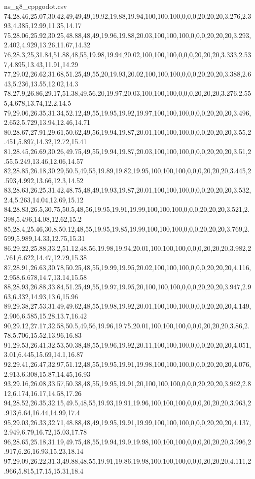 \begin{filecontents*}[overwrite]{ns_g8_cppgodot.csv}
74,28.46,25.07,30.42,49,49,49,19.92,19.88,19.94,100,100,100,0,0,0,20,20,20,3.276,2.393,4.385,12.99,11.35,14.17
75,28.06,25.92,30.25,48.88,48,49,19.96,19.88,20.03,100,100,100,0,0,0,20,20,20,3.293,2.402,4.929,13.26,11.67,14.32
76,28.3,25,31.84,51.88,48,55,19.98,19.94,20.02,100,100,100,0,0,0,20,20,20,3.333,2.537,4.895,13.43,11.91,14.29
77,29.02,26.62,31.68,51.25,49,55,20,19.93,20.02,100,100,100,0,0,0,20,20,20,3.388,2.643,5.236,13.55,12.02,14.3
78,27.9,26.86,29.17,51.38,49,56,20,19.97,20.03,100,100,100,0,0,0,20,20,20,3.276,2.555,4.678,13.74,12.2,14.5
79,29.06,26.35,31.34,52.12,49,55,19.95,19.92,19.97,100,100,100,0,0,0,20,20,20,3.496,2.652,5.729,13.94,12.46,14.71
80,28.67,27.91,29.61,50.62,49,56,19.94,19.87,20.01,100,100,100,0,0,0,20,20,20,3.55,2.451,5.897,14.32,12.72,15.41
81,28.45,26.69,30.26,49.75,49,55,19.94,19.87,20.03,100,100,100,0,0,0,20,20,20,3.51,2.55,5.249,13.46,12.06,14.57
82,28.85,26.18,30.29,50.5,49,55,19.89,19.82,19.95,100,100,100,0,0,0,20,20,20,3.445,2.593,4.992,13.66,12.3,14.52
83,28.63,26.25,31.42,48.75,48,49,19.93,19.87,20.01,100,100,100,0,0,0,20,20,20,3.532,2.4,5.263,14.04,12.69,15.12
84,28.83,26.5,30.75,50.5,48,56,19.95,19.91,19.99,100,100,100,0,0,0,20,20,20,3.521,2.398,5.496,14.08,12.62,15.2
85,28.4,25.46,30.8,50.12,48,55,19.95,19.85,19.99,100,100,100,0,0,0,20,20,20,3.769,2.599,5.989,14.33,12.75,15.31
86,29.22,25.88,33.2,51.12,48,56,19.98,19.94,20.01,100,100,100,0,0,0,20,20,20,3.982,2.761,6.622,14.47,12.79,15.38
87,28.91,26.63,30.78,50.25,48,55,19.99,19.95,20.02,100,100,100,0,0,0,20,20,20,4.116,2.958,6.678,14.7,13.14,15.58
88,28.93,26.88,33.84,51.25,49,55,19.97,19.95,20,100,100,100,0,0,0,20,20,20,3.947,2.963,6.332,14.93,13.6,15.96
89,29.38,27.53,31.49,49.62,48,55,19.98,19.92,20.01,100,100,100,0,0,0,20,20,20,4.149,2.906,6.585,15.28,13.7,16.42
90,29.12,27.17,32.58,50.5,49,56,19.96,19.75,20.01,100,100,100,0,0,0,20,20,20,3.86,2.78,5.706,15.52,13.96,16.83
91,29.53,26.41,32.53,50.38,48,55,19.96,19.92,20.11,100,100,100,0,0,0,20,20,20,4.051,3.01,6.445,15.69,14.1,16.87
92,29.41,26.47,32.97,51.12,48,55,19.95,19.91,19.98,100,100,100,0,0,0,20,20,20,4.076,2.913,6.308,15.87,14.45,16.93
93,29.16,26.08,33.57,50.38,48,55,19.95,19.91,20,100,100,100,0,0,0,20,20,20,3.962,2.812,6.174,16.17,14.58,17.26
94,28.52,26.35,32.15,49.5,48,55,19.93,19.91,19.96,100,100,100,0,0,0,20,20,20,3.963,2.913,6.64,16.44,14.99,17.4
95,29.03,26.33,32.71,48.88,48,49,19.95,19.91,19.99,100,100,100,0,0,0,20,20,20,4.137,2.949,6.79,16.72,15.03,17.78
96,28.65,25.18,31.19,49.75,48,55,19.94,19.9,19.98,100,100,100,0,0,0,20,20,20,3.996,2.917,6.26,16.93,15.23,18.14
97,29.09,26.22,31.3,49.88,48,55,19.91,19.86,19.98,100,100,100,0,0,0,20,20,20,4.111,2.966,5.815,17.15,15.31,18.4

\end{filecontents*}
